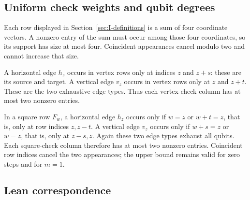 \documentclass{article}
\numberwithin{equation}{section}
\begin{document}
\subsection{Uniform check weights and qubit degrees}\label{sec:I-weights}

Each row displayed in Section~\ref{sec:I-definitions} is a sum of four coordinate
vectors.
A nonzero entry of the sum must occur among those four coordinates,
so its support has size at most four. Coincident appearances cancel
modulo two and cannot increase that size.

A horizontal edge \(h_z\) occurs in vertex rows only at indices \(z\)
and \(z+s\): these are its source and target. A vertical edge \(v_z\)
occurs in vertex rows only at \(z\) and \(z+t\). These are the two
exhaustive edge types. Thus each vertex-check column has at most two
nonzero entries.

In a square row \(F_w\), a horizontal edge \(h_z\) occurs only if
\(w=z\) or \(w+t=z\), that is, only at row indices \(z,z-t\). A vertical
edge \(v_z\) occurs only if \(w+s=z\) or \(w=z\), that is, only at
\(z-s,z\). Again these two edge types exhaust all qubits. Each
square-check column therefore has at most two nonzero entries.
Coincident row indices cancel the two appearances; the upper bound
remains valid for zero steps and for \(m=1\).

\subsection{Lean correspondence}\label{sec:I-lean}
\end{document}
